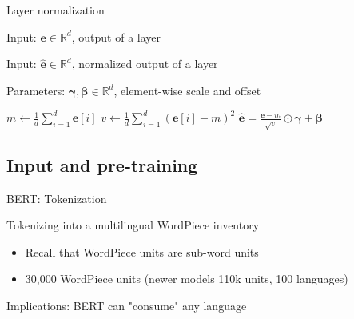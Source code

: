 \documentclass[12pt,aspectratio=169,handout]{beamer}
\begin{document}
\begin{frame}{Layer normalization}
	
	Input: $\bm{e} \in \mathbb{R}^{d}$, output of a layer
	
	Input: $\bm{\hat e} \in \mathbb{R}^{d}$, normalized output of a layer
	
	Parameters: $\bm{\gamma}, \bm{\beta} \in \mathbb{R}^{d}$, element-wise scale and offset
	
	\begin{algorithmic}[1]
		\State $m \gets \frac{1}{d} \sum_{i = 1}^{d} \bm{e}[i]$
		\State $v \gets \frac{1}{d} \sum_{i = 1}^{d} (\bm{e}[i] - m)^2$
		\State \Return $\bm{\hat e} = \frac{\bm{e} - m}{\sqrt{v}} \odot \bm{\gamma} + \bm{\beta}$
		\EndFunction
	\end{algorithmic}	
	
\end{frame}



\subsection{Input and pre-training}

\begin{frame}{BERT: Tokenization}
	
	Tokenizing into a multilingual WordPiece inventory
	
	\begin{itemize}
		\item Recall that WordPiece units are sub-word units
		\item 30,000 WordPiece units (newer models 110k units, 100 languages)
	\end{itemize}
	
	Implications: BERT can "consume" any language
	
	
\end{frame}
\end{document}
